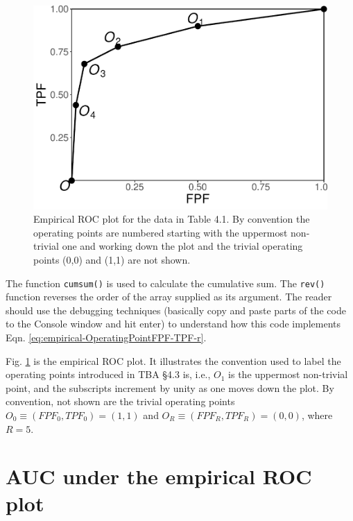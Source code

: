 \documentclass[
]{book}
\begin{document}
\begin{figure}
\centering
\includegraphics{05-empirical-auc_files/figure-latex/empirical-AUC-EmpiricalPlot-1.pdf}
\caption{\label{fig:empirical-AUC-EmpiricalPlot}Empirical ROC plot for the data in Table 4.1. By convention the operating points are numbered starting with the uppermost non-trivial one and working down the plot and the trivial operating points (0,0) and (1,1) are not shown.}
\end{figure}

The function \texttt{cumsum()} is used to calculate the cumulative sum. The \texttt{rev()} function reverses the order of the array supplied as its argument. The reader should use the debugging techniques (basically copy and paste parts of the code to the Console window and hit enter) to understand how this code implements Eqn. \eqref{eq:empirical-OperatingPointFPF-TPF-r}.

Fig. \ref{fig:empirical-AUC-EmpiricalPlot} is the empirical ROC plot. It illustrates the convention used to label the operating points introduced in TBA §4.3 is, i.e., \(O_1\) is the uppermost non-trivial point, and the subscripts increment by unity as one moves down the plot. By convention, not shown are the trivial operating points \(O_0 \equiv (FPF_0, TPF_0) = (1,1)\) and \(O_R \equiv (FPF_R, TPF_R) = (0,0)\), where \(R = 5\).

\hypertarget{auc-under-the-empirical-roc-plot}{%
\section{AUC under the empirical ROC plot}\label{auc-under-the-empirical-roc-plot}}
\end{document}
